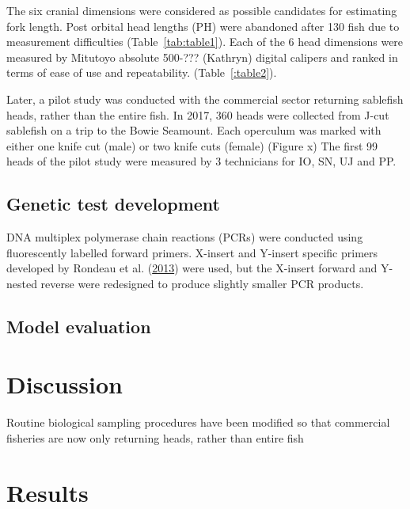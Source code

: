 \documentclass[12pt]{article}\usepackage[]{graphicx}\usepackage[]{color}
\begin{document}
The six cranial dimensions were considered as possible candidates for estimating fork length. Post orbital head lengths (PH) were abandoned after 130 fish due to measurement difficulties (Table~\ref{tab:table1}). Each of the 6 head dimensions were measured by Mitutoyo absolute 500-??? (Kathryn) digital calipers and ranked in terms of ease of use and repeatability. (Table~\ref{:table2}).

Later, a pilot study was conducted with the commercial sector returning sablefish heads, rather than the entire fish. In 2017, 360 heads were collected from J-cut sablefish on a trip to the Bowie Seamount. Each operculum was marked with either one knife cut (male) or two knife cuts (female) (Figure x) The first 99 heads of the pilot study were measured by 3 technicians for IO, SN, UJ and PP.

\hypertarget{genetic-test-development}{%
\subsection{Genetic test development}\label{genetic-test-development}}

DNA multiplex polymerase chain reactions (PCRs) were conducted using fluorescently labelled forward primers. X-insert and Y-insert specific primers developed by Rondeau et al. (\protect\hyperlink{ref-Rondeau2013}{2013}) were used, but the X-insert forward and Y-nested reverse were redesigned to produce slightly smaller PCR products.

\hypertarget{model-evaluation}{%
\subsection{Model evaluation}\label{model-evaluation}}

\hypertarget{discussion}{%
\section{Discussion}\label{discussion}}

Routine biological sampling procedures have been modified so that commercial fisheries are now only returning heads, rather than entire fish

\clearpage

\hypertarget{results}{%
\section{Results}\label{results}}
\end{document}
